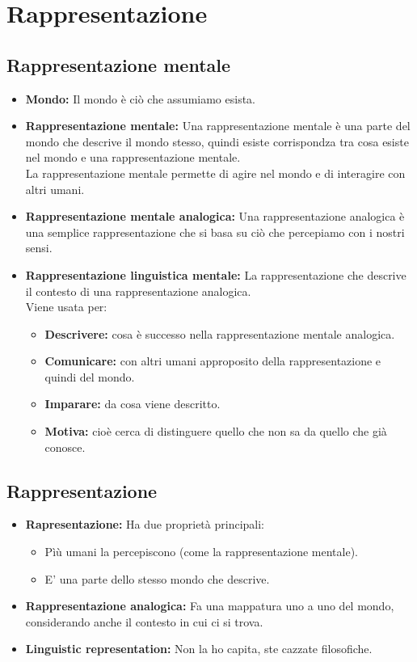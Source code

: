 \documentclass[../main.tex]{subfiles}
\begin{document}
    \chapter{Rappresentazione}

    \section{Rappresentazione mentale}
    \begin{itemize}
        \item \textbf{Mondo:} Il mondo è ciò che assumiamo esista.
        \item \textbf{Rappresentazione mentale:} Una rappresentazione mentale è una parte del mondo che descrive il mondo stesso, quindi esiste corrispondza tra cosa esiste nel mondo e una rappresentazione mentale.\\
            La rappresentazione mentale permette di agire nel mondo e di interagire con altri umani.
        \item \textbf{Rappresentazione mentale analogica:} Una rappresentazione analogica è una semplice rappresentazione che si basa su ciò che percepiamo con i nostri sensi.
        \item \textbf{Rappresentazione linguistica mentale:} La rappresentazione che descrive il contesto di una rappresentazione analogica.\\
            Viene usata per:
            \begin{itemize}
                \item \textbf{Descrivere:} cosa è successo nella rappresentazione mentale analogica.
                \item \textbf{Comunicare:} con altri umani approposito della rappresentazione e quindi del mondo.
                \item \textbf{Imparare:} da cosa viene descritto.
                \item \textbf{Motiva:} cioè cerca di distinguere quello che non sa da quello che già conosce. 
            \end{itemize}
    \end{itemize}

    \section{Rappresentazione}
    \begin{itemize}
        \item \textbf{Rapresentazione:} Ha due proprietà principali:
            \begin{itemize}
                \item Pìù umani la percepiscono (come la rappresentazione mentale).
                \item E' una parte dello stesso mondo che descrive.
            \end{itemize}
        \item \textbf{Rappresentazione analogica:} Fa una mappatura uno a uno del mondo, considerando anche il contesto in cui ci si trova.
        \item \textbf{Linguistic representation:} Non la ho capita, ste cazzate filosofiche.
    \end{itemize}
\end{document}
